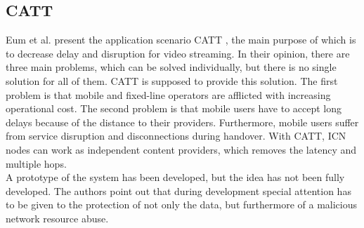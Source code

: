 \subsection{CATT}
Eum et al. present the application scenario CATT \cite{Eum:2015:DII:2803530.2803728}, the main purpose of which is to decrease delay and disruption for video streaming. In their opinion, there are three main problems, which can be solved individually, but there is no single solution for all of them. CATT is supposed to provide this solution. The first problem is that mobile and fixed-line operators are afflicted with increasing operational cost. The second problem is that mobile users have to accept long delays because of the distance to their providers. Furthermore, mobile users suffer from service disruption and disconnections during handover. With CATT, ICN nodes can work as independent content providers, which removes the latency and multiple hops. \\
A prototype of the system has been developed, but the idea has not been fully developed. The authors point out that during development special attention has to be given to the protection of not only the data, but furthermore of a malicious network resource abuse.
